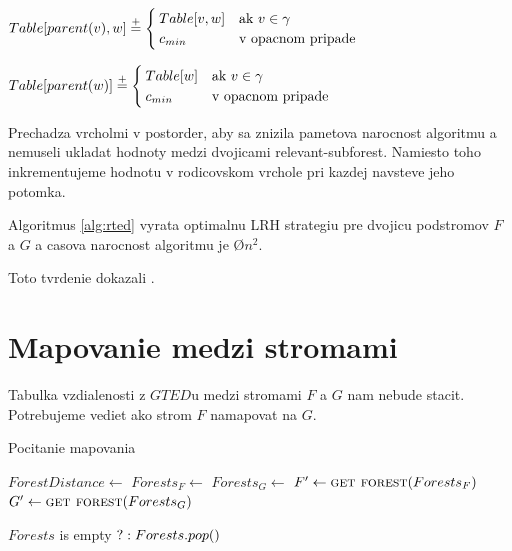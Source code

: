 \begin{algorithm}
\begin{algorithmic}[1]
  \item[]

      \State $Table[parent(v), w] \stackrel{+}{=}
        \begin{cases}
          Table[v, w] & \text{ak $v \in \gamma$}
          \\
          c_{min} & \text{v opacnom pripade}
        \end{cases}$
    \EndProcedure

      \State $Table[parent(w)] \stackrel{+}{=}
        \begin{cases}
          Table[w] & \text{ak $v \in \gamma$}
          \\
          c_{min} & \text{v opacnom pripade}
        \end{cases}$
    \EndProcedure
  \end{algorithmic}
\end{algorithm}

Prechadza vrcholmi v postorder, aby sa znizila pametova narocnost algoritmu a nemuseli ukladat hodnoty
medzi dvojicami relevant-subforest. Namiesto toho inkrementujeme hodnotu v rodicovskom vrchole pri
kazdej navsteve jeho potomka.

\begin{lemma}
  Algoritmus \ref{alg:rted} vyrata optimalnu LRH strategiu pre dvojicu podstromov $F$ a $G$ a
  casova narocnost algoritmu je \O{$n^2$}.
\end{lemma}

\begin{dukaz}
  Toto tvrdenie dokazali \citet{RTED}.
\end{dukaz}


\section{Mapovanie medzi stromami}

Tabulka vzdialenosti z $GTED$u medzi stromami $F$ a $G$ nam nebude stacit.
Potrebujeme vediet ako strom $F$ namapovat na $G$.

\begin{algorithm}
  \caption{Pocitanie mapovania}
  \label{alg:rted}
  \begin{algorithmic}[1]
      \State $ForestDistance \gets$ 
      \State $Forests_{F} \gets$ 
      \State $Forests_{G} \gets$ 
        \State $F' \gets \Call{get forest}{Forests_{F}}$
        \State $G' \gets \Call{get forest}{Forests_{G}}$
        \EndWhile
      \EndWhile
      \EndFor
    \EndProcedure
  \item[]
      \State \Return $Forests$ is empty $? \empty : Forests.pop()$
    \EndProcedure
  \end{algorithmic}
\end{algorithm}


